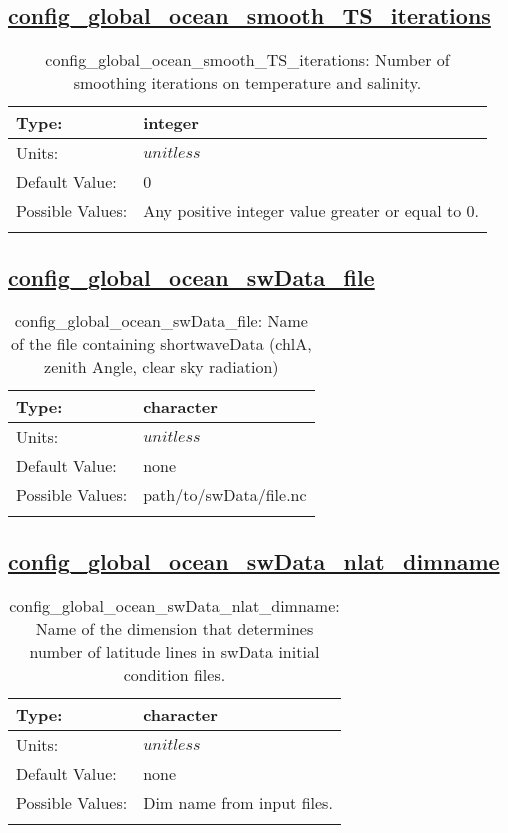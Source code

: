 \subsection[config\_global\_ocean\_smooth\_TS\_iterations]{\hyperref[sec:nm_tab_global_ocean]{config\_global\_ocean\_smooth\_TS\_iterations}}
\label{subsec:nm_sec_config_global_ocean_smooth_TS_iterations}
\begin{center}
\begin{longtable}{| p{2.0in} || p{4.0in} |}
    \hline
    Type: & integer \\
    \hline
    Units: & $unitless$ \\
    \hline
    Default Value: & 0 \\
    \hline
    Possible Values: & Any positive integer value greater or equal to 0. \\
    \hline
    \caption{config\_global\_ocean\_smooth\_TS\_iterations: Number of smoothing iterations on temperature and salinity.}
\end{longtable}
\end{center}
\subsection[config\_global\_ocean\_swData\_file]{\hyperref[sec:nm_tab_global_ocean]{config\_global\_ocean\_swData\_file}}
\label{subsec:nm_sec_config_global_ocean_swData_file}
\begin{center}
\begin{longtable}{| p{2.0in} || p{4.0in} |}
    \hline
    Type: & character \\
    \hline
    Units: & $unitless$ \\
    \hline
    Default Value: & none \\
    \hline
    Possible Values: & path/to/swData/file.nc \\
    \hline
    \caption{config\_global\_ocean\_swData\_file: Name of the file containing shortwaveData (chlA, zenith Angle, clear sky radiation)}
\end{longtable}
\end{center}
\subsection[config\_global\_ocean\_swData\_nlat\_dimname]{\hyperref[sec:nm_tab_global_ocean]{config\_global\_ocean\_swData\_nlat\_dimname}}
\label{subsec:nm_sec_config_global_ocean_swData_nlat_dimname}
\begin{center}
\begin{longtable}{| p{2.0in} || p{4.0in} |}
    \hline
    Type: & character \\
    \hline
    Units: & $unitless$ \\
    \hline
    Default Value: & none \\
    \hline
    Possible Values: & Dim name from input files. \\
    \hline
    \caption{config\_global\_ocean\_swData\_nlat\_dimname: Name of the dimension that determines number of latitude lines in swData initial condition files.}
\end{longtable}
\end{center}
